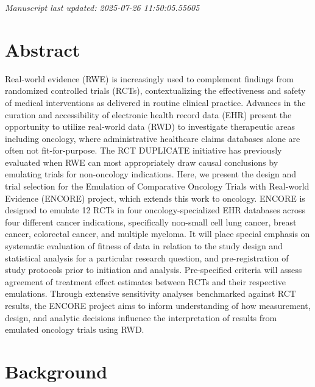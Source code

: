 \documentclass[
  letterpaper,
  DIV=11,
  numbers=noendperiod]{scrartcl}
\begin{document}
\emph{Manuscript last updated: 2025-07-26 11:50:05.55605}

\newpage{}

\section*{Abstract}\label{abstract}

Real-world evidence (RWE) is increasingly used to complement findings
from randomized controlled trials (RCTs), contextualizing the
effectiveness and safety of medical interventions as delivered in
routine clinical practice. Advances in the curation and accessibility of
electronic health record data (EHR) present the opportunity to utilize
real-world data (RWD) to investigate therapeutic areas including
oncology, where administrative healthcare claims databases alone are
often not fit-for-purpose. The RCT DUPLICATE initiative has previously
evaluated when RWE can most appropriately draw causal conclusions by
emulating trials for non-oncology indications. Here, we present the
design and trial selection for the Emulation of Comparative Oncology
Trials with Real-world Evidence (ENCORE) project, which extends this
work to oncology. ENCORE is designed to emulate 12 RCTs in four
oncology-specialized EHR databases across four different cancer
indications, specifically non-small cell lung cancer, breast cancer,
colorectal cancer, and multiple myeloma. It will place special emphasis
on systematic evaluation of fitness of data in relation to the study
design and statistical analysis for a particular research question, and
pre-registration of study protocols prior to initiation and analysis.
Pre-specified criteria will assess agreement of treatment effect
estimates between RCTs and their respective emulations. Through
extensive sensitivity analyses benchmarked against RCT results, the
ENCORE project aims to inform understanding of how measurement, design,
and analytic decisions influence the interpretation of results from
emulated oncology trials using RWD.

\newpage{}

\section{Background}\label{background}
\end{document}
